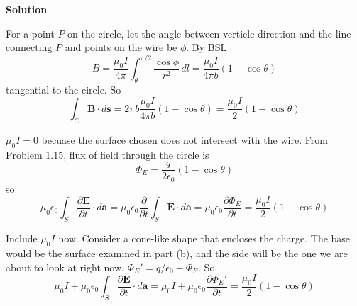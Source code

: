 \documentclass{article}
\begin{document}
\begin{homeworkProblem}
	\textbf{Solution}
	\begin{enumerate}[label= (\alph*)]
		\begin{item}
			For a point $P$ on the circle, let the angle between verticle direction and the line connecting $P$ and points on the wire be $\phi$. By BSL
			\[
				B=\frac{\mu_0I}{4\pi}\int_\theta^{\pi/2}\frac{\cos\phi}{r^2}\,dl=\frac{\mu_0I}{4\pi b}(1-\cos\theta)
			\]
			tangential to the circle. So
			\[
				\int_C\mathbf{B}\cdot d\mathbf{s}=2\pi b\frac{\mu_0I}{4\pi b}(1-\cos\theta)=\frac{\mu_0I}{2}(1-\cos\theta)
			\]
		\end{item}
		\begin{item}
			$\mu_0I=0$ becuase the surface chosen does not intersect with the wire. From Problem 1.15, flux of field through the circle is
			\[
				\Phi_E=\frac{q}{2\epsilon_0}(1-\cos\theta)
			\]
			so
			\[
				\mu_0\epsilon_0\int_S\frac{\partial\mathbf{E}}{\partial t}\cdot d\mathbf{a}=\mu_0\epsilon_0\frac{\partial}{\partial t}\int_S\mathbf{E}\cdot d\mathbf{a}=\mu_0\epsilon_0\frac{\partial\Phi_E}{\partial t}=\frac{\mu_0I}{2}(1-\cos\theta)
			\]
		\end{item}
		\begin{item}
			Include $\mu_0I$ now. Consider a cone-like shape that encloses the charge. The base would be the surface examined in part (b), and the side will be the one we are about to look at right now. ${\Phi_E}'=q/\epsilon_0-\Phi_E$. So
			\[
				\mu_0I+\mu_0\epsilon_0\int_S\frac{\partial\mathbf{E}}{\partial t}\cdot d\mathbf{a}=\mu_0I+\mu_0\epsilon_0\frac{\partial{\Phi_E}'}{\partial t}=\frac{\mu_0I}{2}(1-\cos\theta)
			\]
		\end{item}
	\end{enumerate}
\end{homeworkProblem}

\end{document}
